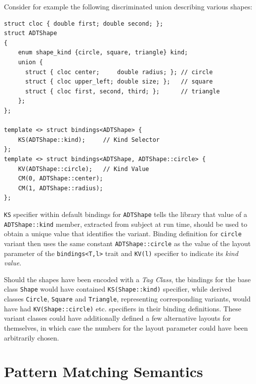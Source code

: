 \documentclass[preprint]{sigplanconf}
\makeatletter
\DeclareRobustCommand{\code}[1]{{\lstinline[breaklines=false,escapechar=@]{#1}}}
\makeatother
\begin{document}
Consider for example the following discriminated union describing various 
shapes:

\begin{lstlisting}[keepspaces,columns=flexible]
struct cloc { double first; double second; };
struct ADTShape
{
    enum shape_kind {circle, square, triangle} kind;
    union {
      struct { cloc center;     double radius; }; // circle
      struct { cloc upper_left; double size; };   // square
      struct { cloc first, second, third; };      // triangle
    };
};

template <> struct bindings<ADTShape> { 
    KS(ADTShape::kind);     // Kind Selector
};
template <> struct bindings<ADTShape, ADTShape::circle> {
    KV(ADTShape::circle);   // Kind Value
    CM(0, ADTShape::center);
    CM(1, ADTShape::radius);
};
\end{lstlisting}

\noindent
\code{KS} specifier within default bindings for \code{ADTShape} tells the library 
that value of a \code{ADTShape::kind} member, extracted from subject at run time, 
should be used to obtain a unique value that identifies the variant. Binding 
definition for \code{circle} variant then uses the same constant 
\code{ADTShape::circle} as the value of the layout parameter of the 
\code{bindings<T,l>} trait and \code{KV(l)} specifier to indicate its \emph{kind 
value}.

Should the shapes have been encoded with a \emph{Tag Class}, the bindings for 
the base class \code{Shape} would have contained \code{KS(Shape::kind)} 
specifier, while derived classes \code{Circle}, \code{Square} and 
\code{Triangle}, representing corresponding variants, would have had 
\code{KV(Shape::circle)} etc. specifiers in their binding definitions. These 
variant classes could have additionally defined a few alternative layouts for 
themselves, in which case the numbers for the layout parameter could have been 
arbitrarily chosen.

\section{Pattern Matching Semantics}
\label{sec:sem}
\end{document}
